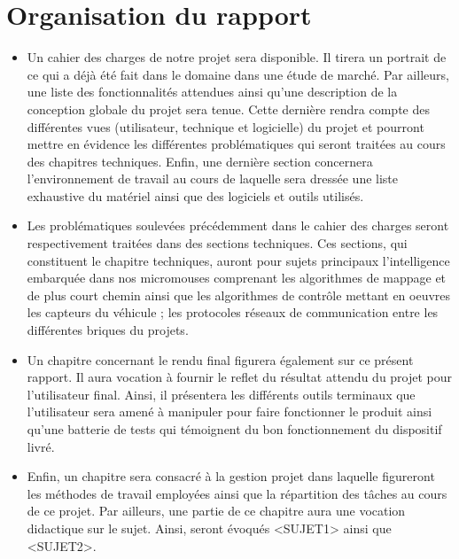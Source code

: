 \section{Organisation du rapport} \label{sec:organisation}

\begin{itemize}
	\item Un cahier des charges de notre projet sera disponible. Il tirera un portrait 
de ce qui a déjà été fait dans le domaine dans une étude de marché. Par ailleurs, 
une liste des fonctionnalités attendues ainsi qu'une description de la conception 
globale du projet sera tenue. Cette dernière rendra compte des différentes vues 
(utilisateur, technique et logicielle) du projet et pourront mettre en évidence les 
différentes problématiques qui seront traitées au cours des chapitres techniques. 
Enfin, une dernière section concernera l'environnement de travail au cours de laquelle 
sera dressée une liste exhaustive du matériel ainsi que des logiciels et outils utilisés.\\


	\item Les problématiques soulevées précédemment dans le cahier des charges seront 
respectivement traitées dans des sections techniques. Ces sections, qui constituent 
le chapitre techniques, auront pour sujets principaux l'intelligence embarquée dans 
nos micromouses comprenant les algorithmes de mappage et de plus court chemin ainsi 
que les algorithmes de contrôle mettant en oeuvres les capteurs du véhicule ; les protocoles 
réseaux de communication entre les différentes briques du projets. \\


	\item Un chapitre concernant le rendu final figurera également sur ce présent rapport. 
Il aura vocation à fournir le reflet du résultat attendu du projet pour l'utilisateur 
final. Ainsi, il présentera les différents outils terminaux que l'utilisateur sera amené 
à manipuler pour faire fonctionner le produit ainsi qu'une batterie de tests qui témoignent 
du bon fonctionnement du dispositif livré. \\


	\item Enfin, un chapitre sera consacré à la gestion projet dans laquelle figureront les méthodes 
de travail employées ainsi que la répartition des tâches au cours de ce projet. 
Par ailleurs, une partie de ce chapitre aura une vocation didactique sur le sujet. 
Ainsi, seront évoqués <SUJET1> ainsi que <SUJET2>. \\
\end{itemize}
